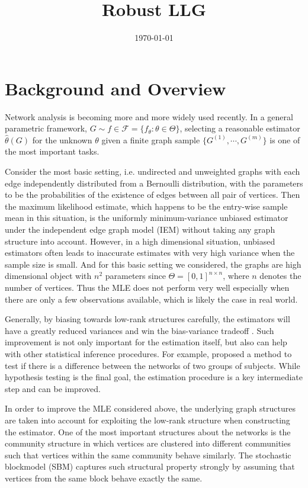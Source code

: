 \documentclass[a4paper]{article}
\title{Robust LLG}
\date{\today}
\renewcommand{\hat}{\widehat}
\begin{document}
\maketitle

\section{Background and Overview}

Network analysis is becoming more and more widely used recently. In a general parametric framework, $G \sim f \in \mathcal{F} = \{f_{\theta} : \theta \in \Theta \}$, selecting a reasonable estimator $\hat{\theta}(G)$ for the unknown $\theta$ given a finite graph sample $\{G^{(1)}, \cdots, G^{(m)}\}$ is one of the most important tasks.

Consider the most basic setting, i.e. undirected and unweighted graphs with each edge independently distributed from a Bernoulli distribution, with the parameters to be the probabilities of the existence of edges between all pair of vertices.
Then the maximum likelihood estimate, which happens to be the entry-wise sample mean in this situation, is the uniformly minimum-variance unbiased estimator under the independent edge graph model (IEM) \citep{bollobas2007phase} without taking any graph structure into account. 
However, in a high dimensional situation, unbiased estimators often leads to inaccurate estimates with very high variance when the sample size is small. And for this basic setting we considered, the graphs are high dimensional object with $n^2$ parameters since $\Theta = [0, 1]^{n\times n}$, where $n$ denotes the number of vertices. Thus the MLE does not perform very well especially when there are only a few observations available, which is likely the case in real world.

Generally, by biasing towards low-rank structures carefully, the estimators will have a greatly reduced variances and win the bias-variance tradeoff \citep{trunk1979problem}. Such improvement is not only important for the estimation itself, but also can help with other statistical inference procedures. For example, \citet{ginestet2014hypothesis} proposed a method to test if there is a difference between the networks of two groups of subjects. While hypothesis testing is the final goal, the estimation procedure is a key intermediate step and can be improved.

In order to improve the MLE considered above, the underlying graph structures are taken into account for exploiting the low-rank structure when constructing the estimator. One of the most important structures about the networks is the community structure in which vertices are clustered into different communities such that vertices within the same community behave similarly. The stochastic blockmodel (SBM) \citep{holland1983stochastic} captures such structural property strongly by assuming that vertices from the same block behave exactly the same.
\end{document}
